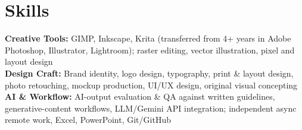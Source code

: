 \documentclass[10pt,letterpaper]{article}
\begin{document}
\section*{Skills}
\textbf{Creative Tools:} GIMP, Inkscape, Krita (transferred from 4+ years in Adobe Photoshop, Illustrator, Lightroom); raster editing, vector illustration, pixel and layout design\\[2pt]
\textbf{Design Craft:} Brand identity, logo design, typography, print \& layout design, photo retouching, mockup production, UI/UX design, original visual concepting\\[2pt]
\textbf{AI \& Workflow:} AI-output evaluation \& QA against written guidelines, generative-content workflows, LLM/Gemini API integration; independent async remote work, Excel, PowerPoint, Git/GitHub
\end{document}
